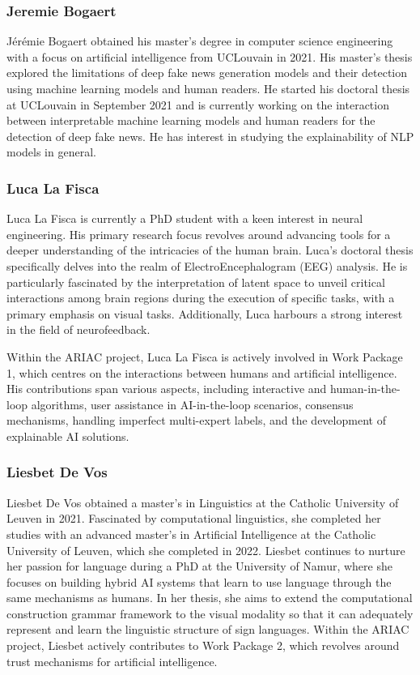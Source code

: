 \subsubsection{Jeremie Bogaert}

Jérémie Bogaert obtained his master's degree in computer science engineering with a focus on artificial intelligence from UCLouvain in 2021. His master's thesis explored the limitations of deep fake news generation models and their detection using machine learning models and human readers. He started his doctoral thesis at UCLouvain in September 2021 and is currently working on the interaction between interpretable machine learning models and human readers for the detection of deep fake news. He has interest in studying the explainability of NLP models in general.

\subsubsection{Luca La Fisca}

Luca La Fisca is currently a PhD student with a keen interest in neural engineering. His primary research focus revolves around advancing tools for a deeper understanding of the intricacies of the human brain. Luca's doctoral thesis specifically delves into the realm of ElectroEncephalogram (EEG) analysis. He is particularly fascinated by the interpretation of latent space to unveil critical interactions among brain regions during the execution of specific tasks, with a primary emphasis on visual tasks. Additionally, Luca harbours a strong interest in the field of neurofeedback.

Within the ARIAC project, Luca La Fisca is actively involved in Work Package 1, which centres on the interactions between humans and artificial intelligence. His contributions span various aspects, including interactive and human-in-the-loop algorithms, user assistance in AI-in-the-loop scenarios, consensus mechanisms, handling imperfect multi-expert labels, and the development of explainable AI solutions.

\subsubsection{Liesbet De Vos}

Liesbet De Vos obtained a master's in Linguistics at the Catholic University of Leuven in 2021. Fascinated by computational linguistics, she completed her studies with an advanced master's in Artificial Intelligence at the Catholic University of Leuven, which she completed in 2022. Liesbet continues to nurture her passion for language during a PhD at the University of Namur, where she focuses on building hybrid AI systems that learn to use language through the same mechanisms as humans. In her thesis, she aims to extend the computational construction grammar framework to the visual modality so that it can adequately represent and learn the linguistic structure of sign languages. Within the ARIAC project, Liesbet actively contributes to Work Package 2, which revolves around trust mechanisms for artificial intelligence. 

